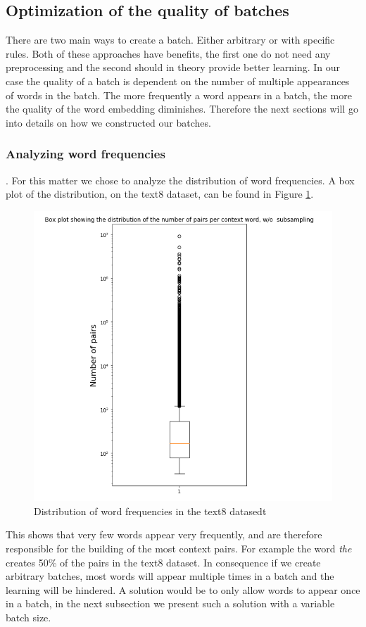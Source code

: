 \subsection{Optimization of the quality of batches}
There are two main ways to create a batch. Either arbitrary or with specific rules. Both of these approaches have benefits, the first one do not need any preprocessing  and the second should in theory provide better learning. In our case the quality of a batch is dependent on  the number of multiple appearances of words in the batch. The more frequently a word appears in a batch, the more the quality of the word embedding diminishes. Therefore the next sections will go into details on how we constructed our batches. 

\subsubsection{Analyzing word frequencies}
. For this matter we chose to analyze the distribution of word frequencies. A box plot of the distribution, on the text8 dataset, can be found in Figure \ref{fig:boxplot_freq}. 
\begin{figure}[h]
\centering
\includegraphics[scale=0.3]{images/no_sampling_boxplot}
\caption{Distribution of word frequencies in the text8 datasedt}
\label{fig:boxplot_freq}
\end{figure} 
This shows that very few words appear very frequently, and are therefore responsible for the building of the most context pairs. For example the word \textit{the} creates 50\% of the pairs in the text8 dataset. In consequence if we create arbitrary batches, most words  will appear multiple times in a batch and the learning will be hindered. A solution would be to only allow words to appear once in a batch, in the next subsection we present such a solution with a variable batch size. 
